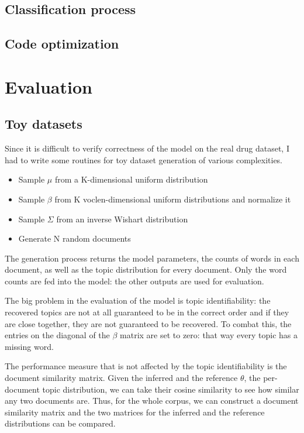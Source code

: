 \documentclass[12pt,a4paper,twoside,openright]{report}
\begin{document}
\section{Classification process}

\section{Code optimization}

\chapter{Evaluation}

\section{Toy datasets}

Since it is difficult to verify correctness of the model on the real drug dataset, I had to write some routines for toy dataset generation of various complexities.

\begin{itemize}
\item Sample $\mu$ from a K-dimensional uniform distribution
\item Sample $\beta$ from K voclen-dimensional uniform distributions and normalize it
\item Sample $\Sigma$ from an inverse Wishart distribution
\item Generate N random documents
\end{itemize}

The generation process returns the model parameters, the counts of words in each document, as well as the topic distribution for every document. Only the word counts are fed into the model: the other outputs are used for evaluation.

The big problem in the evaluation of the model is topic identifiability: the recovered topics are not at all guaranteed to be in the correct order and if they are close together, they are not guaranteed to be recovered. To combat this, the entries on the diagonal of the $\beta$ matrix are set to zero: that way every topic has a missing word.

The performance measure that is not affected by the topic identifiability is the document similarity matrix. Given the inferred and the reference $\theta$, the per-document topic distribution, we can take their cosine similarity to see how similar any two documents are. Thus, for the whole corpus, we can construct a document similarity matrix and the two matrices for the inferred and the reference distributions can be compared.
\end{document}
